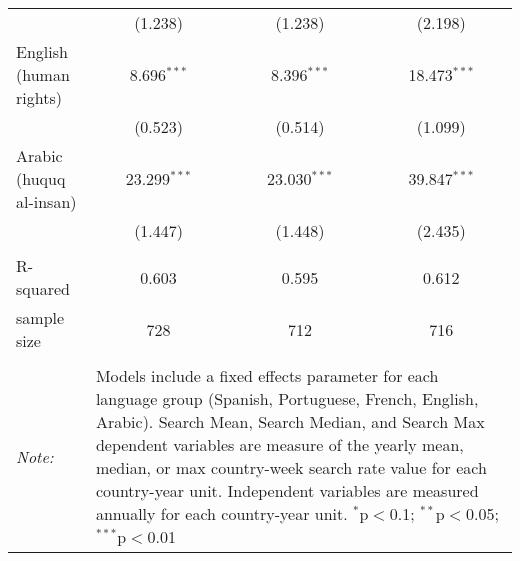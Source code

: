 \begin{table}[!htbp]
\begin{tabular}{@{\extracolsep{5pt}}lccc}
  & (1.238) & (1.238) & (2.198) \\ 
  English (human rights) & 8.696$^{***}$ & 8.396$^{***}$ & 18.473$^{***}$ \\ 
  & (0.523) & (0.514) & (1.099) \\ 
  Arabic (huquq al-insan) & 23.299$^{***}$ & 23.030$^{***}$ & 39.847$^{***}$ \\ 
  & (1.447) & (1.448) & (2.435) \\ 
 \hline \\[-1.8ex] 
R-squared  & 0.603 & 0.595 & 0.612 \\ 
sample size  & 728 & 712 & 716 \\ 
\hline 
\hline \\[-1.8ex] 
\textit{Note:}  & \multicolumn{3}{l}{\parbox[t]{8cm}{Models include a fixed effects parameter for each language group (Spanish, Portuguese, French, English, Arabic). Search Mean, Search Median, and Search Max dependent variables are measure of the yearly mean, median, or max country-week search rate value for each country-year unit. Independent variables are measured annually for each country-year unit. $^{*}$p$<$0.1; $^{**}$p$<$0.05; $^{***}$p$<$0.01}} \\ 
\end{tabular} 
\end{table} 
